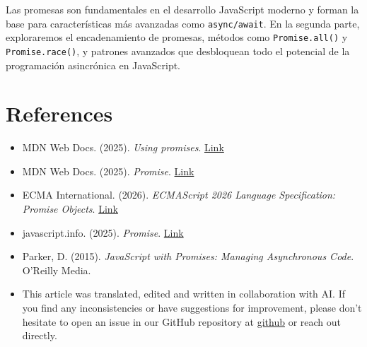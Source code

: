 \documentclass[12pt,letterpaper]{article}
\begin{document}
Las promesas son fundamentales en el desarrollo JavaScript moderno y forman la base para características más avanzadas como \texttt{\textcolor{accentColor}{async/await}}. En la segunda parte, exploraremos el encadenamiento de promesas, métodos como \texttt{\textcolor{accentColor}{Promise.all()}} y \texttt{\textcolor{accentColor}{Promise.race()}}, y patrones avanzados que desbloquean todo el potencial de la programación asincrónica en JavaScript.

\section{References}

\begin{itemize}
    \item MDN Web Docs. (2025). \textit{Using promises}. \href{https://developer.mozilla.org/en-US/docs/Web/JavaScript/Guide/Using_promises}{Link}
    
    \item MDN Web Docs. (2025). \textit{Promise}. \href{https://developer.mozilla.org/en-US/docs/Web/JavaScript/Reference/Global_Objects/Promise}{Link}
    
    \item ECMA International. (2026). \textit{ECMAScript 2026 Language Specification: Promise Objects}. \href{https://tc39.es/ecma262/multipage/control-abstraction-objects.html#sec-promise-objects}{Link}
    
    \item javascript.info. (2025). \textit{Promise}. \href{https://javascript.info/promise-basics}{Link}
    
    \item Parker, D. (2015). \textit{JavaScript with Promises: Managing Asynchronous Code}. O'Reilly Media.

    \item This article was translated, edited and written in collaboration with AI. If you find any inconsistencies or have suggestions for improvement, please don't hesitate to open an issue in our GitHub repository at \href{https://github.com/asanchezyali/social-media-posts}{github} or reach out directly.
\end{itemize}
\end{document}
